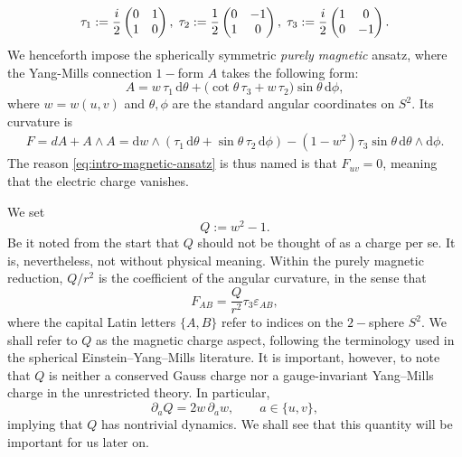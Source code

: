 \documentclass{article}[11pt]
\numberwithin{equation}{section}
\begin{document}
\begin{equation}
\tau_1 := \frac{i}{2}\begin{pmatrix}
0 & 1 \\ 1 & 0
\end{pmatrix},\hspace{1mm} \tau_2 := \frac{1}{2}\begin{pmatrix}
0 & -1 \\ 1 & 0
\end{pmatrix}, \hspace{1mm} \tau_3 := \frac{i}{2}\begin{pmatrix}
1 & 0 \\ 0 & -1
\end{pmatrix}.
\end{equation}
We henceforth impose the spherically symmetric \textit{purely magnetic} ansatz, where the  Yang-Mills connection $1-$form  $A$ takes the following form: 
\begin{equation}
    A
    =
    w\,\tau_1\,\mathrm d\theta
    +
    \bigl(\cot\theta\,\tau_3+w\,\tau_2\bigr)
       \sin\theta\,\mathrm d\phi ,
    \label{eq:intro-magnetic-ansatz}
\end{equation}
where \(w=w(u,v)\) and $\theta, \phi$ are the standard angular coordinates on $S^2$. Its curvature is
\begin{equation}
\begin{split}
    F
    = dA + A \wedge A =
    \mathrm dw\wedge
    (
       \tau_1\,\mathrm d\theta
       +\sin\theta\,\tau_2\,\mathrm d\phi
    ) 
        -(1-w^2)\tau_3\sin\theta\,
       \mathrm d\theta\wedge\mathrm d\phi .
\end{split}
\label{eq:intro-curvature}
\end{equation}
The reason \eqref{eq:intro-magnetic-ansatz} is thus named is that $F_{uv}=0$, meaning that the electric charge vanishes.

\vspace{3mm}

\noindent We set
\begin{equation}
    Q:=w^2-1.
    \label{eq:intro-Q}
\end{equation}
Be it noted from the start that $Q$ should not be thought of as a charge per se. It is, nevertheless, not without physical meaning. Within the purely magnetic reduction, \(Q/r^2\) is the coefficient of the
angular curvature, in the sense that
\[ F_{AB} = \frac{Q}{r^2}\tau_3 \varepsilon_{AB},   \]where the capital Latin letters $\{A,B 
\}$ refer to indices on the $2-$sphere $S^2$. We shall refer to \(Q\) as the magnetic
charge aspect, following the terminology used in the spherical
Einstein--Yang--Mills literature. It is important, however, to note   that \(Q\) is
neither a conserved Gauss charge nor a gauge-invariant Yang--Mills charge
in the unrestricted theory. In particular,
\begin{equation}
    \partial_a Q=2w\,\partial_a w,
    \qquad a\in\{u,v\},
\end{equation}
implying that $Q$ has nontrivial dynamics. We shall see that this quantity will be important for us later on. \vspace{3mm}
\end{document}
